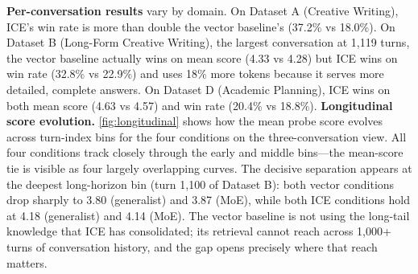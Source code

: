 \documentclass[10pt]{article}
\begin{document}
\textbf{Per-conversation results} vary by domain. On Dataset A (Creative Writing), ICE's win rate is more than double the vector baseline's (37.2\% vs 18.0\%). On Dataset B (Long-Form Creative Writing), the largest conversation at 1{,}119 turns, the vector baseline actually wins on mean score (4.33 vs 4.28) but ICE wins on win rate (32.8\% vs 22.9\%) and uses 18\% more tokens because it serves more detailed, complete answers. On Dataset D (Academic Planning), ICE wins on both mean score (4.63 vs 4.57) and win rate (20.4\% vs 18.8\%). \textbf{Longitudinal score evolution.} \cref{fig:longitudinal} shows how the mean probe score evolves across turn-index bins for the four conditions on the three-conversation view. All four conditions track closely through the early and middle bins---the mean-score tie is visible as four largely overlapping curves. The decisive separation appears at the deepest long-horizon bin (turn 1{,}100 of Dataset B): both vector conditions drop sharply to 3.80 (generalist) and 3.87 (MoE), while both ICE conditions hold at 4.18 (generalist) and 4.14 (MoE). The vector baseline is not using the long-tail knowledge that ICE has consolidated; its retrieval cannot reach across 1{,}000+ turns of conversation history, and the gap opens precisely where that reach matters.
\end{document}
